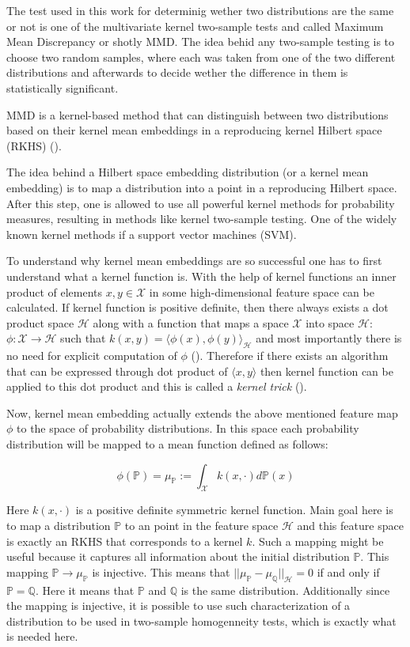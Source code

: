 The test used in this work for determinig wether two distributions are the same or not is one of the multivariate kernel two-sample tests and called Maximum Mean Discrepancy or shotly MMD. The idea behid any two-sample testing is to choose two random samples, where each was taken from one of the two different distributions and afterwards to decide wether the difference in them is statistically significant. 

MMD is a kernel-based method that can distinguish between two distributions based on their kernel mean embeddings  in a reproducing kernel Hilbert space (RKHS) (\cite{Rabanser_2018}).

The idea behind a Hilbert space embedding distribution (or a kernel mean embedding) is to map a distribution into a point in a reproducing Hilbert space. After this step, one is allowed to use all powerful kernel methods for probability measures, resulting in methods like kernel two-sample testing. One of the widely known kernel methods if a support vector machines (SVM).

To understand why kernel mean embeddings are so successful one has to first understand what a kernel function is. With the help of kernel functions an inner product of elements $x, y \in \mathcal{X}$ in some high-dimensional feature space can be calculated. If kernel function is positive definite, then there always exists a dot product space $\mathscr{H}$ along with a function that maps a space $\mathcal{X}$ into space $\mathscr{H}$: $\phi : \mathcal{X} \rightarrow \mathscr{H}$ such that $k(x, y) = {\langle\phi(x), \phi(y)\rangle}_{\mathscr{H}}$ and most importantly there is no need for explicit computation of $\phi$ (\cite{Smola_2002}). Therefore if there exists an algorithm that can be expressed through dot product of $\langle x, y \rangle$ then kernel function can be applied to this dot product and this is called a \textit{kernel trick} (\cite{Smola_2002}).

Now, kernel mean embedding actually extends the above mentioned feature map $\phi$ to the space of probability distributions. In this space each probability distribution will be mapped to a mean function defined as follows:

\begin{equation}
    \phi(\mathds{P}) = \mu_{\mathds{P}} := \int_{\mathcal{X}}k(x, \cdot)d\mathds{P}(x)
\end{equation}

Here $k(x, \cdot)$ is a positive definite symmetric kernel function. Main goal here is to map a distribution $\mathds{P}$ to an point in the feature space $\mathscr{H}$ and this feature space is exactly an RKHS that corresponds to a kernel $k$. Such a mapping might be useful because it captures all information about the initial distribution $\mathds{P}$. This mapping $\mathds{P} \rightarrow \mu_\mathds{P}$ is injective. This means that $||\mu_\mathds{P} - \mu_\mathds{Q}||_{\mathscr{H}} = 0$ if and only if $\mathds{P} = \mathds{Q}$. Here it means that $\mathds{P}$ and $\mathds{Q}$ is the same distribution. Additionally since the mapping is injective, it is possible to use such characterization of a distribution to be used in two-sample homogenneity tests, which is exactly what is needed here. 

